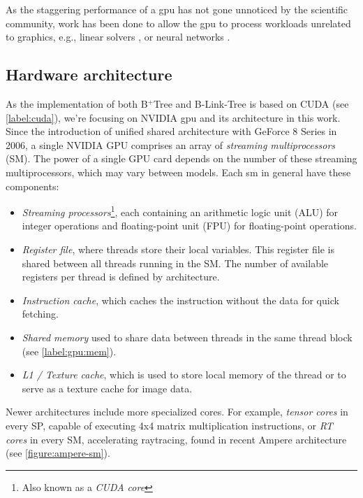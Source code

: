 As the staggering performance of a \acrshort{gpu} has not gone unnoticed by the scientific community, work has been done to allow the \acrshort{gpu} to process workloads unrelated to graphics, e.g., linear solvers \cite{cusolver}, or neural networks \cite{cudnn}.

\subsection{Hardware architecture}

As the implementation of both B$^+$Tree and B-Link-Tree is based on CUDA (see \cref{label:cuda}), we're focusing on NVIDIA \acrshort{gpu} and its architecture in this work. Since the introduction of unified shared architecture with GeForce 8 Series in 2006, a single NVIDIA GPU comprises an array of \textit{streaming multiprocessors} (SM). The power of a single GPU card depends on the number of these streaming multiprocessors, which may vary between models. Each \acrshort{sm} in general have these components:
\begin{itemize}
  \item \textit{Streaming processors}\footnote{Also known as a \textit{CUDA core}}, each containing an arithmetic logic unit (ALU) for integer operations and floating-point unit (FPU) for floating-point operations.
  \item \textit{Register file}, where threads store their local variables. This register file is shared between all threads running in the SM. The number of available registers per thread is defined by architecture.
  \item \textit{Instruction cache}, which caches the instruction without the data for quick fetching.
  \item \textit{Shared memory} used to share data between threads in the same thread block (see \cref{label:gpu:mem}).
  \item \textit{L1 / Texture cache}, which is used to store local memory of the thread or to serve as a texture cache for image data.
\end{itemize}

Newer architectures include more specialized cores. For example, \textit{tensor cores} in every SP, capable of executing 4x4 matrix multiplication instructions, or \textit{RT cores} in every SM, accelerating raytracing, found in recent Ampere architecture (see \cref{figure:ampere-sm}).

